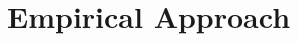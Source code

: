 \documentclass[12pt]{article}
\begin{document}
\begin{comment}
\begin{flushleft}
\scalebox{.9}{
\begin{tabular}{|c|l|r|}
\hline
NAICS & Industry & No funding\\
\hline
61 & Educational Services &	19.2\%\\
71 & Arts, Entertainment, and Recreation  &	17.9\%\\
22 & Utilities	 & 16.8\%\\
55 & Management of Companies and Enterprises &	15.4\%\\
52 & Finance and Insurance &	14.5\%\\
54 & Professional, Scientific and Technical Services &	12.1\%\\
21 & Mining, Quarrying, and Oil and Gas Extraction & 	11.9\%\\
23 & Construction &	11.8\%\\
51 & Information &	11.8\%\\
62 & Health Care and Social Assistance &	11.8\%\\
53 & Real Estate and Rental and Leasing &	11.6\%\\
56 & Administrative, Support, Waste Management, Remediation Services &	11.0\%\\
11 & Agriculture, Forestry, Fishing and Hunting &	10.2\%\\
42 & Wholesale Trade &	10.1\%\\
48-49 & Transportation and Warehousing &	9.3\%\\
31-33 & Manufacturing &	9.1\%\\
81 & Other Services, except Public Administration &	8.7\%\\
44-45 & Retail Trade &	6.9\%\\
72 & Accommodation and Food Services &	5.3\%\\
\hline
\end{tabular}
}
\end{flushleft}

Finally, we use the 2012 Economic Census Industry Series for information about the concentration of non-profits per industry. The data classifies firms by whether they are exempt from federal income tax in some service industries. We exclude the subset of industries relating to health care services.

\end{comment}

\section{Empirical Approach}
\label{sec:regression}
\end{document}
